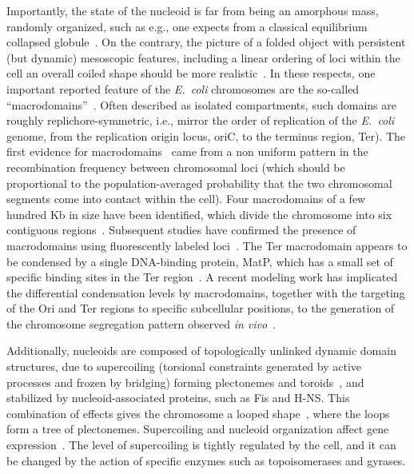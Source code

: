 \documentclass[
preprint,
a4paper,
12pt,
superscriptaddress,
pre]{revtex4}
\begin{document}
Importantly, the state of the nucleoid is far from being an amorphous
mass, randomly organized, such as e.g., one expects from a classical
equilibrium collapsed globule~\cite{Mirny2011}. On the contrary, the
picture of a folded object with persistent (but dynamic) mesoscopic
features, including a linear ordering of loci within the cell an
overall coiled shape should be more
realistic~\cite{WLP+06,Wiggins2010,HadizadehYazdi2012,Fisher2013,Pelletier2012}.
In these respects, one important reported feature of the
\emph{E.~coli} chromosomes are the so-called
``macrodomains''~\cite{VPR+04,MRB05,EB06}. Often described as isolated
compartments, such domains are roughly replichore-symmetric, i.e.,
mirror the order of replication of the \emph{E.~coli} genome, from the
replication origin locus, oriC, to the terminus region, Ter). The
first evidence for macrodomains~\cite{VPR+04} came from a non uniform
pattern in the recombination frequency between chromosomal loci (which
should be proportional to the population-averaged probability that the
two chromosomal segments come into contact within the cell).
%
Four macrodomains of a few hundred Kb in size have been identified,
which divide the chromosome into six contiguous
regions~\cite{Dame2011,Benza2012}.  Subsequent studies have confirmed
the presence of macrodomains using fluorescently labeled
loci~\cite{EMB08,EB06,LMB+05}. The Ter macrodomain appears to be
condensed by a single DNA-binding protein, MatP, which has a small set
of specific binding sites in the Ter region~\cite{Mercier2008}.
A recent modeling work has implicated the differential condensation
levels by macrodomains, together with the targeting of the Ori and Ter
regions to specific subcellular positions, to the generation of the
chromosome segregation pattern observed \emph{in
  vivo}~\cite{Junier2013}.

Additionally, nucleoids are composed of topologically unlinked dynamic
domain structures, due to supercoiling (torsional constraints
generated by active processes and frozen by bridging) forming
plectonemes and toroids~\cite{Trun1998}, and stabilized by
nucleoid-associated proteins, such as Fis and H-NS. This combination
of effects gives the chromosome a looped
shape~\cite{Postow2004,Skoko2006,Kavenoff1976}, where the loops form a
tree of plectonemes. Supercoiling and nucleoid organization affect
gene expression~\cite{Breier2004,Postow2004,Dillon2010}.
The level of supercoiling is tightly regulated by the cell, and it can
be changed by the action of specific enzymes such as topoisomerases
and gyrases.
\end{document}

